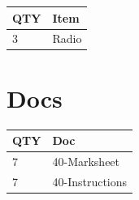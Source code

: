 \documentclass[10pt, A5]{article}
\begin{document}
\begin{framed}
\begin{minipage}{\textwidth}
\begin{multicols}{2}
		
	\begin{center}
			\begin{tabular}{p{2cm}p{4cm}}


				\textbf{QTY} & \textbf{Item} \\\toprule
												3&Radio\\\midrule
								\end{tabular}

			\end{center}

		
		\vfill\null
		\columnbreak

			\section*{\faFile \: Docs}
		 	\begin{center}
			\begin{tabular}{p{2cm}p{4cm}}

			\textbf{QTY} & \textbf{Doc} \\\toprule
										7&40-Marksheet\\\midrule
										7&40-Instructions\\\midrule
							\end{tabular}
			\end{center}
	

		\vfill\null

		\end{multicols}
\end{minipage}
\end{framed}
\end{document}
